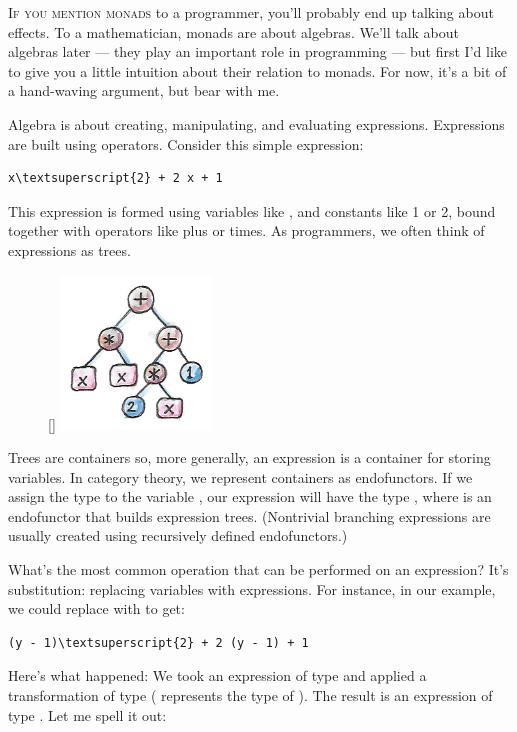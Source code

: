 \lettrine[lhang=0.17]{I}{f you mention monads} to a programmer, you'll probably end up talking
about effects. To a mathematician, monads are about algebras. We'll talk
about algebras later --- they play an important role in programming ---
but first I'd like to give you a little intuition about their relation
to monads. For now, it's a bit of a hand-waving argument, but bear with
me.

Algebra is about creating, manipulating, and evaluating expressions.
Expressions are built using operators. Consider this simple expression:

\begin{Verbatim}[commandchars=\\\{\}]
x\textsuperscript{2} + 2 x + 1
\end{Verbatim}
This expression is formed using variables like , and constants
like 1 or 2, bound together with operators like plus or times. As
programmers, we often think of expressions as trees.

\begin{figure}
\raisebox{0pt}[\dimexpr{}\baselineskip\relax]{
\includegraphics[width=40mm]{images/exptree.png}}%
\end{figure}

\noindent
Trees are containers so, more generally, an expression is a container
for storing variables. In category theory, we represent containers as
endofunctors. If we assign the type  to the variable
, our expression will have the type , where
 is an endofunctor that builds expression trees. (Nontrivial
branching expressions are usually created using recursively defined
endofunctors.)

What's the most common operation that can be performed on an expression?
It's substitution: replacing variables with expressions. For instance,
in our example, we could replace  with  to
get:

\begin{Verbatim}[commandchars=\\\{\}]
(y - 1)\textsuperscript{2} + 2 (y - 1) + 1
\end{Verbatim}
Here's what happened: We took an expression of type  and
applied a transformation of type 
( represents the type of ). The result is an
expression of type . Let me spell it out:

